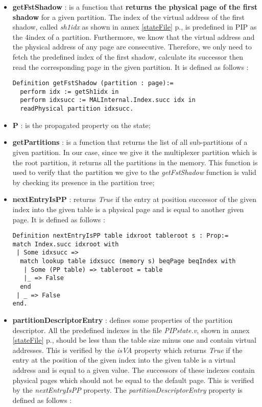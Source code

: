 \begin{itemize}
	\item \textbf{getFstShadow} : is a function that \textbf{returns the physical page of the first shadow} for a given partition. The index of the virtual address of the first shadow, called \textit{sh1idx} as shown in annex \ref{stateFile} p.\pageref{stateFile}, is predefined in PIP as the 4\rth index of a partition. Furthermore, we know that the virtual address and the physical address of any page are consecutive. Therefore, we only need to fetch the predefined index of the first shadow, calculate its successor then read the corresponding page in the given partition. It is defined as follows :
\begin{lstlisting}[caption = {getFstShadow function in the shallow embedding}]
Definition getFstShadow (partition : page):=
  perform idx := getSh1idx in
  perform idxsucc := MALInternal.Index.succ idx in
  readPhysical partition idxsucc.
\end{lstlisting} 
\vspace{4pt}
	\item \textbf{P} : is the propagated property on the state;
	\item \textbf{getPartitions} : is a function that returns the list of all sub-partitions of a given partition. In our case, since we give it the multiplexer partition which is the root partition, it returns all the partitions in the memory. This function is used to verify that the partition we give to the \textit{getFstShadow} function is valid by checking its presence in the partition tree;
	\item \textbf{nextEntryIsPP} : returns \textit{True} if the entry at position successor of the given index into the given table is a physical page and is equal to another given page. It is defined as follows :
\begin{lstlisting}[caption = {nextEntryIsPP property},mathescape=true, xleftmargin=-.1\textwidth, xrightmargin=-.05\textwidth,label={nextEnt}]
Definition nextEntryIsPP table idxroot tableroot s : Prop:= 
match Index.succ idxroot with 
 | Some idxsucc => 
  match lookup table idxsucc (memory s) beqPage beqIndex with 
   | Some (PP table) => tableroot = table
   |_ => False 
  end
 | _ => False 
end.
\end{lstlisting} 
	\item \textbf{partitionDescriptorEntry} : defines some properties of the partition descriptor. All the predefined indexes in the file \textit{PIPstate.v}, shown in annex \ref{stateFile} p.\pageref{stateFile}, should be less than the table size minus one and contain virtual addresses. This is verified by the \textit{isVA} property which returns \textit{True} if the entry at the position of the given index into the given table is a virtual address and is equal to a given value. The successors of these indexes contain physical pages which should not be equal to the default page. This is verified by the \textit{nextEntryIsPP} property. The \textit{partitionDescriptorEntry} property is defined as follows :

\end{itemize}
